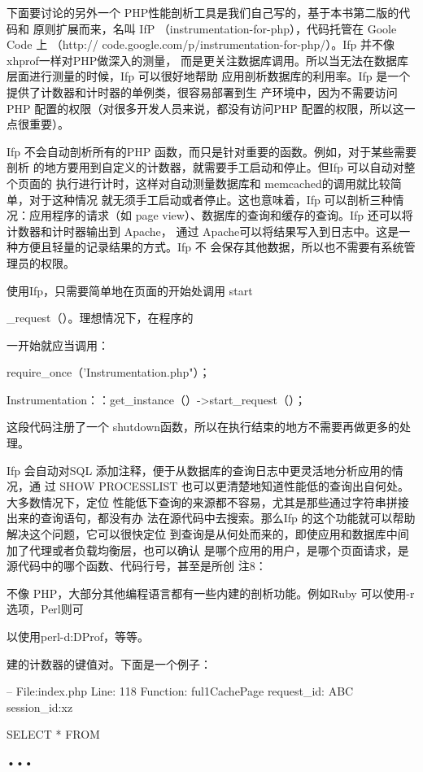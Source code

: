 下面要讨论的另外一个 PHP性能剖析工具是我们自己写的，基于本书第二版的代码和
原则扩展而来，名叫 IfP （instrumentation-for-php），代码托管在 Goole Code 上 （http://
code.google.com/p/instrumentation-for-php/）。Ifp 并不像xhprof一样对PHP做深入的测量，
而是更关注数据库调用。所以当无法在数据库层面进行测量的时候，Ifp 可以很好地帮助
应用剖析数据库的利用率。Ifp 是一个提供了计数器和计时器的单例类，很容易部署到生
产环境中，因为不需要访问 PHP 配置的权限（对很多开发人员来说，都没有访问PHP
配置的权限，所以这一点很重要）。

Ifp 不会自动剖析所有的PHP 函数，而只是针对重要的函数。例如，对于某些需要剖析
的地方要用到自定义的计数器，就需要手工启动和停止。但Ifp 可以自动对整个页面的
执行进行计时，这样对自动测量数据库和 memcached的调用就比较简单，对于这种情况
就无须手工启动或者停止。这也意味着，Ifp 可以剖析三种情况：应用程序的请求（如
page view）、数据库的查询和缓存的查询。Ifp 还可以将计数器和计时器输出到 Apache，
通过 Apache可以将结果写入到日志中。这是一种方便且轻量的记录结果的方式。Ifp 不
会保存其他数据，所以也不需要有系统管理员的权限。

使用Ifp，只需要简单地在页面的开始处调用 start

\_request（）。理想情况下，在程序的

一开始就应当调用：

require\_once（'Instrumentation.php"）；

Instrumentation：：get\_instance（）->start\_request（）；

这段代码注册了一个 shutdown函数，所以在执行结束的地方不需要再做更多的处理。

Ifp 会自动对SQL 添加注释，便于从数据库的查询日志中更灵活地分析应用的情况，通
过 SHOW PROCESSLIST 也可以更清楚地知道性能低的查询出自何处。大多数情况下，定位
性能低下查询的来源都不容易，尤其是那些通过字符串拼接出来的查询语句，都没有办
法在源代码中去搜索。那么Ifp 的这个功能就可以帮助解决这个问题，它可以很快定位
到查询是从何处而来的，即使应用和数据库中间加了代理或者负载均衡层，也可以确认
是哪个应用的用户，是哪个页面请求，是源代码中的哪个函数、代码行号，甚至是所创
注8：

不像 PHP，大部分其他编程语言都有一些内建的剖析功能。例如Ruby 可以使用-r选项，Perl则可

以使用perl-d:DProf，等等。

建的计数器的键值对。下面是一个例子：

-- File:index.php Line: 118 Function: ful1CachePage request\_id: ABC session\_id:xz

SELECT * FROM

•••


